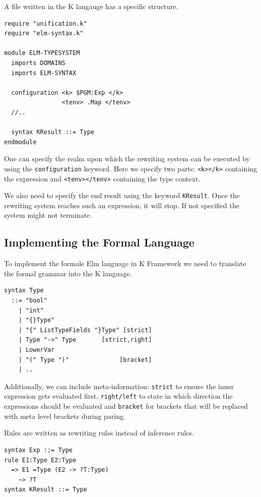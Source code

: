 \documentclass[]{scrbook}
\theoremstyle{definition}
\theoremstyle{definition}
\theoremstyle{definition}
\theoremstyle{remark}
\begin{document}
A file written in the K langauge has a specific structure.

\begin{verbatim}
require "unification.k"
require "elm-syntax.k"

module ELM-TYPESYSTEM
  imports DOMAINS
  imports ELM-SYNTAX

  configuration <k> $PGM:Exp </k>
                <tenv> .Map </tenv>
  //..
  
  syntax KResult ::= Type
endmodule
\end{verbatim}

One can specify the realm upon which the rewriting system can be
executed by using the \texttt{configuration} keyword. Here we specify
two parts:
\texttt{\textless{}k\textgreater{}\textless{}/k\textgreater{}}
containing the expression and
\texttt{\textless{}tenv\textgreater{}\textless{}/tenv\textgreater{}}
containing the type context.

We also need to specify the end result using the keyword
\texttt{KResult}. Once the rewriting system reaches such an expression,
it will stop. If not specified the system might not terminate.

\subsection{Implementing the Formal
Language}\label{implementing-the-formal-language}

To implement the formale Elm language in K Framework we need to
translate the formal grammar into the K language.

\begin{verbatim}
syntax Type
  ::= "bool"
    | "int"
    | "{}Type"
    | "{" ListTypeFields "}Type" [strict]
    | Type "->" Type       [strict,right]
    | LowerVar
    | "(" Type ")"              [bracket]
    | ..
\end{verbatim}

Additionally, we can include meta-information: \texttt{strict} to ensure
the inner expression gets evaluated first, \texttt{right/left} to state
in which direction the expressions should be evaluated and
\texttt{bracket} for brackets that will be replaced with meta level
brackets during paring.

Rules are written as rewriting rules instead of inference rules.

\begin{verbatim}
syntax Exp ::= Type
rule E1:Type E2:Type
  => E1 =Type (E2 -> ?T:Type)
    ~> ?T
syntax KResult ::= Type
\end{verbatim}
\end{document}
